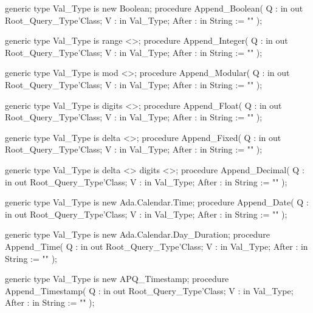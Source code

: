 \documentclass[english,letterpaper]{book}
\begin{document}
\begin{Code}
generic
   type Val_Type is new Boolean;
procedure Append_Boolean(
   Q :     in out Root_Query_Type'Class;
   V :     in     Val_Type;
   After : in     String := ""
);
\end{Code}

\begin{Code}
generic
   type Val_Type is range <>;
procedure Append_Integer(
   Q :     in out Root_Query_Type'Class;
   V :     in     Val_Type;
   After : in     String := ""
);
\end{Code}

\begin{Code}
generic
   type Val_Type is mod <>;
procedure Append_Modular(
   Q :     in out Root_Query_Type'Class;
   V :     in     Val_Type;
   After : in     String := ""
);
\end{Code}

\begin{Code}
generic
   type Val_Type is digits <>;
procedure Append_Float(
   Q :     in out Root_Query_Type'Class;
   V :     in     Val_Type;
   After : in     String := ""
);
\end{Code}

\begin{Code}
generic
   type Val_Type is delta <>;
procedure Append_Fixed(
   Q :     in out Root_Query_Type'Class;
   V :     in     Val_Type;
   After : in     String := ""
);
\end{Code}

\begin{Code}
generic
   type Val_Type is delta <> digits <>;
procedure Append_Decimal(
   Q :     in out Root_Query_Type'Class;
   V :     in     Val_Type;
   After : in     String := ""
);
\end{Code}

\begin{Code}
generic
   type Val_Type is new Ada.Calendar.Time;
procedure Append_Date(
   Q :     in out Root_Query_Type'Class;
   V :     in     Val_Type;
   After : in     String := ""
);
\end{Code}

\begin{Code}
generic
   type Val_Type is new Ada.Calendar.Day_Duration;
procedure Append_Time(
   Q :     in out Root_Query_Type'Class;
   V :     in     Val_Type;
   After : in     String := ""
);
\end{Code}

\begin{Code}
generic
   type Val_Type is new APQ_Timestamp;
procedure Append_Timestamp(
   Q :     in out Root_Query_Type'Class;
   V :     in     Val_Type;
   After : in     String := ""
);
\end{Code}
\end{document}
